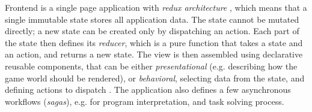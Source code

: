 Frontend is a single page application with \emph{redux architecture}
\cite[chapter\,12]{flux},
which means that a single immutable state stores all application data.
The state cannot be mutated directly; a new state can be created only
by dispatching an action.
Each part of the state then defines its \emph{reducer},
which is a pure function that takes a state and an action, and returns a new state.
The view is then assembled using declarative reusable components, that can
be either \emph{presentational} (e.g. describing how the game world should be
rendered), or \emph{behavioral}, selecting data from the state, %
and defining actions to dispatch \cite{react}. %
The application also defines a few asynchronous workflows (\emph{sagas}),
e.g. for program interpretation, and task solving process. %
%


